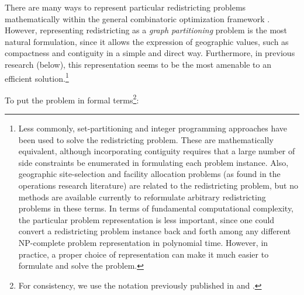 \documentclass[article]{JSSstyle/jss}
\begin{document}
There are many ways to represent particular redistricting problems 
mathematically within the general combinatoric optimization 
framework \citep[][]{Altman97}. However, representing redistricting 
as a \emph{graph partitioning} problem is the most natural formulation, 
since it allows the expression of geographic values, such as compactness 
and contiguity in a simple and direct way. Furthermore, in previous 
research (below), this representation seems to be the most amenable 
to an efficient solution.\footnote{Less commonly, set-partitioning and integer programming 
approaches have been used to solve the redistricting problem. These 
are mathematically equivalent, although incorporating contiguity 
requires that a large number of side constraints be enumerated in 
formulating each problem instance. Also, geographic site-selection and 
facility allocation problems (as found in the operations research 
literature) are related to the redistricting problem, but  no 
methods are available currently to reformulate arbitrary 
redistricting problems in these terms.  In terms of fundamental 
computational complexity, the particular problem representation is 
less important, since one could convert a redistricting problem 
instance back and forth among any different NP-complete problem 
representation in polynomial time. However, in practice, a proper 
choice of representation can make it much easier to formulate and 
solve the problem.}  

To put the problem in formal terms\footnote{For consistency, we use the notation previously published in \citet{Altman97} and \citet{AltmanThesis}.}:
\end{document}

